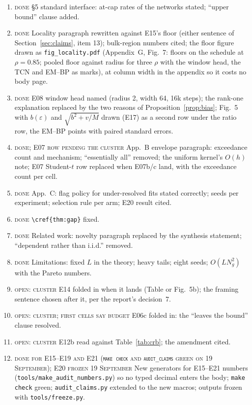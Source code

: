 \begin{enumerate}[label=$\square$, leftmargin=1.6em]
\item \textsc{done} \S5 standard interface: at-cap rates of the networks stated; ``upper bound'' clause added.
\item \textsc{done} Locality paragraph rewritten against E15's floor (either sentence of Section~\ref{sec:claims}, item 13); bulk-region numbers cited; the floor figure drawn as \texttt{fig\_locality.pdf} (Appendix~G, Fig.~7: floors on the schedule at $\rho=0.85$; pooled floor against radius for three $\rho$ with the window head, the TCN and EM--BP as marks), at column width in the appendix so it costs no body page.
\item \textsc{done} E08 window head named (radius 2, width 64, 16k steps); the rank-one explanation replaced by the two reasons of Proposition~\ref{prop:bias}; Fig.~5 with $b(\varepsilon)$ and $\sqrt{b^2+v/M}$ drawn (E17) as a second row under the ratio row, the EM--BP points with paired standard errors.
\item \textsc{done; E07 row pending the cluster} App.~B envelope paragraph: exceedance count and mechanism; ``essentially all'' removed; the uniform kernel's $O(h)$ note; E07 Student-$t$ row replaced when E07b/c land, with the exceedance count per cell.
\item \textsc{done} App.~C: flag policy for under-resolved fits stated correctly; seeds per experiment; selection rule per arm; E20 result cited.
\item \textsc{done} \verb|\cref{thm:gap}| fixed.
\item \textsc{done} Related work: novelty paragraph replaced by the synthesis statement; ``dependent rather than i.i.d.'' removed.
\item \textsc{done} Limitations: fixed $L$ in the theory; heavy tails; eight seeds; $O(LN_g^2)$ with the Pareto numbers.
\item \textsc{open: cluster} E14 folded in when it lands (Table or Fig.~5b); the framing sentence chosen after it, per the report's decision~7.
\item \textsc{open: cluster; first cells say budget} E06c folded in: the ``leaves the bound'' clause resolved.
\item \textsc{open: cluster} E12b read against Table~\ref{tab:crb}; the amendment cited.
\item \textsc{done for E15--E19 and E21 (\texttt{make check} and \texttt{audit\_claims} green on 19 September); E20 frozen 19 September} New generators for E15--E21 numbers (\texttt{tools/make\_audit\_numbers.py}) so no typed decimal enters the body; \texttt{make check} green; \texttt{audit\_claims.py} extended to the new macros; outputs frozen with \texttt{tools/freeze.py}.

\end{enumerate}
